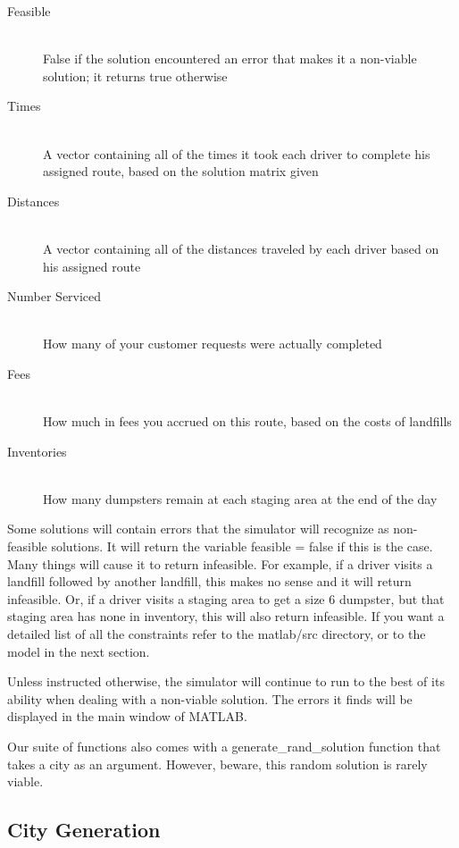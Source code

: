 \documentclass{article}
\begin{document}
\begin{description}
\item[Feasible ]\hfill \\  False if the solution encountered an error that makes it a non-viable solution; it returns true otherwise
\item[Times ] \hfill \\ A vector containing all of the times it took each driver to complete his assigned route, based on the solution matrix given
\item[Distances ] \hfill \\ A vector containing all of the distances traveled by each driver based on his assigned route
\item[Number Serviced ] \hfill \\ How many of your customer requests were actually completed
\item[Fees ] \hfill \\ How much in fees you accrued on this route, based on the costs of landfills
\item[Inventories]\hfill \\  How many dumpsters remain at each staging area at the end of the day
\end{description}

Some solutions will contain errors that the simulator will recognize as non-feasible solutions. 
It will return the variable feasible = false if this is the case. 
Many things will cause it to return infeasible.
For example, if a driver visits a landfill followed by another landfill, this makes no sense and it will return infeasible.  
Or, if a driver visits a staging area to get a size 6 dumpster, but that staging area has none in inventory, this will also return infeasible.
If you want a detailed list of all the constraints refer to the matlab/src directory, or to the model in the next section.


Unless instructed otherwise, the simulator will continue to run to the best of its ability when dealing with a non-viable solution.
The errors it finds will be displayed in the main window of MATLAB.

Our suite of functions also comes with a generate\_rand\_solution function that takes a city as an argument.
However, beware, this random solution is rarely viable.



\subsection{City Generation}
\end{document}
